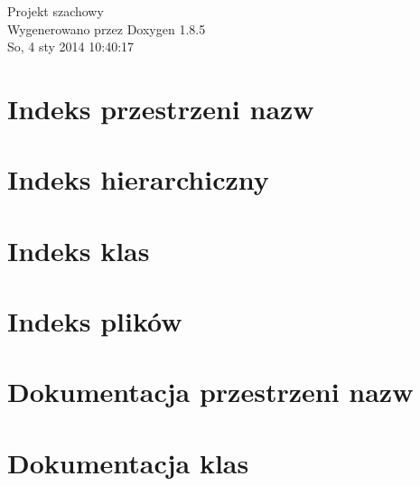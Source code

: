 \documentclass[twoside]{book}
\newcommand{\clearemptydoublepage}{%
  \newpage{\pagestyle{empty}\cleardoublepage}%
}
\begin{document}
\hypersetup{pageanchor=false}
\begin{titlepage}
\vspace*{7cm}
\begin{center}%
{\Large Projekt szachowy }\\
\vspace*{1cm}
{\large Wygenerowano przez Doxygen 1.8.5}\\
\vspace*{0.5cm}
{\small So, 4 sty 2014 10:40:17}\\
\end{center}
\end{titlepage}
\clearemptydoublepage
\tableofcontents
\clearemptydoublepage
{}
\hypersetup{pageanchor=true}

\chapter{Indeks przestrzeni nazw}

\chapter{Indeks hierarchiczny}

\chapter{Indeks klas}

\chapter{Indeks plików}

\chapter{Dokumentacja przestrzeni nazw}



\chapter{Dokumentacja klas}





















\end{document}
